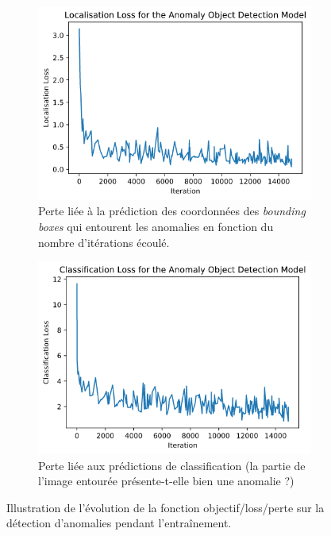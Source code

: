 \documentclass[french]{article}
\theoremstyle{mytheoremstyle}
\theoremstyle{mytheoremstyle}
\theoremstyle{myproblemstyle}
\begin{document}
    \begin{figure}[H]
    \centering
    \begin{subfigure}[t]{0.49\textwidth}
            \centering
            \includegraphics[width=1\textwidth]{images/od_loc_loss.png}
            \caption{Perte liée à la prédiction des coordonnées des \emph{bounding boxes} qui entourent les anomalies en fonction du nombre d'itérations écoulé.}
    \end{subfigure}%
    \hfill
    \begin{subfigure}[t]{0.49\textwidth}
            \centering
            \includegraphics[width=1\textwidth]{images/od_cla_loss.png}
           	\caption{Perte liée aux prédictions de classification (la partie de l'image entourée présente-t-elle bien une anomalie ?)}
    \end{subfigure}
	\caption{Illustration de l'évolution de la fonction objectif/loss/perte sur la détection d'anomalies pendant l'entraînement.}
    \end{figure}
    
\end{document}
